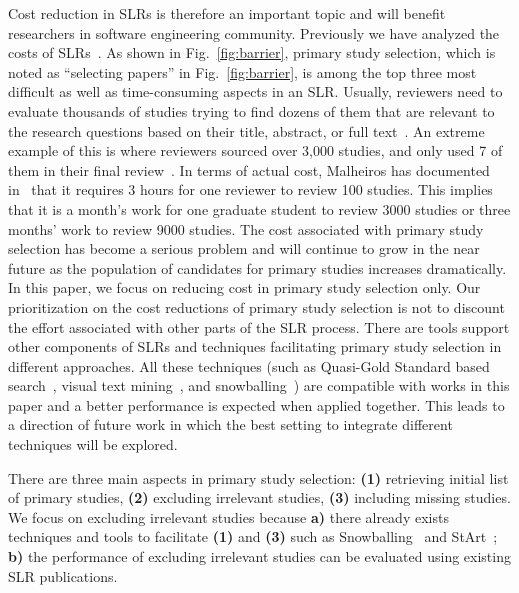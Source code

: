 \documentclass{svjour3}
\theoremstyle{break}
\begin{document}
Cost reduction in SLRs is therefore an important topic and will benefit researchers in software engineering community.
Previously we have analyzed the costs of SLRs~\cite{hassler2014outcomes,carver2013identifying}. As shown in Fig.~\ref{fig:barrier}, primary study selection, which is noted as ``selecting papers'' in Fig.~\ref{fig:barrier}, is among the top three most difficult as well as time-consuming aspects in an SLR. Usually, reviewers need to evaluate thousands of studies trying to find dozens of them that are relevant to the
research questions based on their title, abstract, or full text~\cite{bowes2012slurp}. An extreme
example of this is where reviewers sourced over
3,000 studies, and only used 7 of them in their final review~\cite{bezerra2009systematic}.  In terms of actual
cost, Malheiros has documented in~\cite{malheiros2007visual} that it requires 3 hours for one reviewer to review 100 studies.  This implies that it is a month's work for one graduate student to review 3000 studies or three months' work to review 9000 studies. The cost associated with primary study selection has become a serious problem and will continue to grow in the near future as the population of candidates for primary studies increases dramatically. In this paper, we focus on reducing cost in primary study selection only. Our prioritization on the cost reductions of primary study selection is not to discount the effort associated with other parts of the SLR process. There are tools support other components of SLRs and techniques facilitating primary study selection in different approaches. All these techniques (such as Quasi-Gold Standard based search~\cite{zhang2011empirical,zhang2011identifying}, visual text mining~\cite{Felizardo:2014:VAA:2601248.2601252,felizardo2012visual,felizardo2010approach,malheiros2007visual}, and snowballing~\cite{wohlin2014guidelines,jalali2012systematic}) are compatible with works in this paper and a better performance is expected when applied together. This leads to a direction of future work in which the best setting to integrate different techniques will be explored.

There are three main aspects in primary study selection: \textbf{(1)} retrieving initial list of primary studies, \textbf{(2)} excluding irrelevant studies, \textbf{(3)} including missing studies. We focus on excluding irrelevant studies because \textbf{a)} there already exists techniques and tools to facilitate \textbf{(1)} and \textbf{(3)} such as Snowballing~\cite{jalali2012systematic} and StArt~\cite{hernandes2012using}; \textbf{b)} the performance of excluding irrelevant studies can be evaluated using existing SLR publications.
\end{document}
